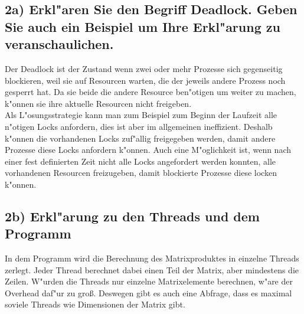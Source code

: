 \documentclass{article}
\begin{document}
\subsection*{2a) Erkl"aren Sie den Begriff \dq Deadlock\dq. Geben Sie auch 
ein Beispiel um Ihre Erkl"arung zu veranschaulichen.}
Der Deadlock ist der Zustand wenn zwei oder mehr Prozesse sich gegenseitig 
blockieren, weil sie auf Resourcen warten, die der jeweils andere Prozess noch 
gesperrt hat. Da sie beide die andere Resource ben"otigen um weiter zu machen, 
k"onnen sie ihre aktuelle Resourcen nicht freigeben. \\
Als L"osungsstrategie kann man zum Beispiel zum Beginn der Laufzeit alle n"otigen 
Locks anfordern, dies ist aber im allgemeinen ineffizient. Deshalb k"onnen die 
vorhandenen Locks zuf"allig freigegeben werden, damit andere Prozesse diese 
Locks anfordern k"onnen. Auch eine M"oglichkeit ist, wenn nach einer fest 
definierten Zeit nicht alle Locks angefordert werden konnten, alle vorhandenen 
Resourcen freizugeben, damit blockierte Prozesse diese locken k"onnen. 

\subsection*{2b) Erkl"arung zu den Threads und dem Programm}
In dem Programm wird die Berechnung des Matrixproduktes in einzelne Threads 
zerlegt. Jeder Thread berechnet dabei einen Teil der Matrix, aber mindestens die 
Zeilen. W"urden die Threads nur einzelne Matrixelemente berechnen, w"are der 
Overhead daf"ur zu gro\ss. Deswegen gibt es auch eine Abfrage, dass es maximal 
soviele Threads wie Dimensionen der Matrix gibt.
\end{document}

